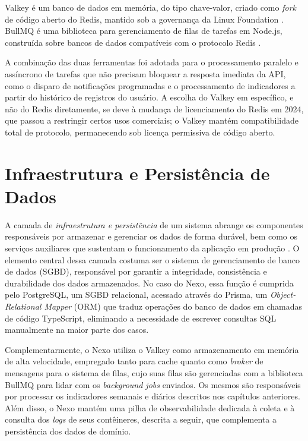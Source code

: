 Valkey é um banco de dados em memória, do tipo chave-valor, criado como
\textit{fork} de código aberto do Redis, mantido sob a governança da Linux
Foundation \citep{valkey:2026}. BullMQ é uma biblioteca para gerenciamento de
filas de tarefas em Node.js, construída sobre bancos de dados compatíveis com
o protocolo Redis \citep{bullmq:2026}.

A combinação das duas ferramentas foi adotada para o processamento paralelo
e assíncrono de tarefas que não precisam bloquear a resposta imediata da API,
como o disparo de notificações programadas e o processamento de indicadores
a partir do histórico de registros do usuário. A escolha do Valkey em
específico, e não do Redis diretamente, se deve à mudança de licenciamento do
Redis em 2024, que passou a restringir certos usos comerciais; o Valkey
mantém compatibilidade total de protocolo, permanecendo sob licença
permissiva de código aberto.

\section{Infraestrutura e Persistência de Dados}

A camada de \textit{infraestrutura e persistência} de um sistema abrange os
componentes responsáveis por armazenar e gerenciar os dados de forma durável,
bem como os serviços auxiliares que sustentam o funcionamento da aplicação em
produção \cite{Fowler_2013}. O elemento central dessa camada costuma ser o
sistema de gerenciamento de banco de dados (SGBD), responsável por garantir a
integridade, consistência e durabilidade dos dados armazenados. No caso do
Nexo, essa função é cumprida pelo PostgreSQL, um SGBD relacional, acessado
através do Prisma, um \textit{Object-Relational Mapper} (ORM) que traduz
operações do banco de dados em chamadas de código TypeScript, eliminando a
necessidade de escrever consultas SQL manualmente na maior parte dos casos.

Complementarmente, o Nexo utiliza o Valkey como armazenamento em memória de
alta velocidade, empregado tanto para cache quanto como \textit{broker} de
mensagens para o sistema de filas, cujo suas filas são gerenciadas com a
biblioteca BullMQ para lidar com os \textit{background jobs} enviados. Os
mesmos são responsáveis por processar os indicadores semanais e diários
descritos nos capítulos anteriores. Além disso, o Nexo mantém uma pilha de
observabilidade dedicada à coleta e à consulta dos \textit{logs} de seus
contêineres, descrita a seguir, que complementa a persistência dos dados de
domínio.


